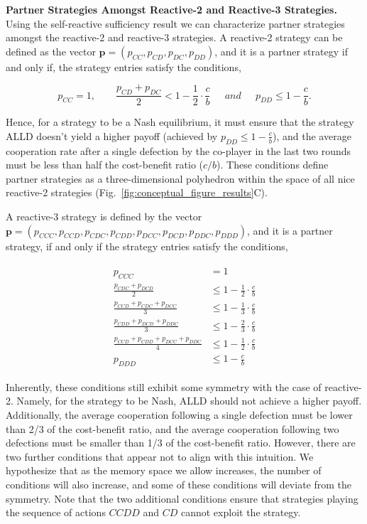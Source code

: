 \documentclass[11pt]{article}
\begin{document}
\textbf{Partner Strategies Amongst Reactive-2 and Reactive-3 Strategies.}
Using the self-reactive sufficiency result we can characterize partner
strategies amongst the reactive-2 and reactive-3 strategies. A reactive-2
strategy can be defined as the vector $\mathbf{p} = (p_{CC}, p_{CD}, p_{DC},
p_{DD})$, and it is a partner strategy if and only if, the strategy entries
satisfy the conditions,

\begin{equation}\label{eq:two_bit_conditions}
  p_{CC} = 1, \qquad \displaystyle \frac{p_{CD} + p_{DC}}{2} < 1 - \frac{1}{2} \cdot \frac{c}{b} \quad ~~and~~ \quad \displaystyle p_{DD} \leq 1\!-\! \frac{c}{b}.
\end{equation}

Hence, for a strategy to be a Nash equilibrium, it must ensure that the strategy
ALLD doesn't yield a higher payoff (achieved by $p_{DD} \leq 1 - \frac{c}{b}$),
and the average cooperation rate after a single defection by the co-player in
the last two rounds must be less than half the cost-benefit ratio ($c/b$). These
conditions define partner strategies as a three-dimensional polyhedron within
the space of all nice reactive-2 strategies
(Fig.~\ref{fig:conceptual_figure_results}C).

A reactive-3 strategy is defined by the vector $\mathbf{p} = (p_{CCC}, p_{CCD},
p_{CDC}, p_{CDD}, p_{DCC}, p_{DCD}, p_{DDC}, p_{DDD})$, and it is a partner strategy,
if and only if the strategy entries satisfy the conditions,

\begin{align}\label{eq:three_bit_conditions}
  \begin{split}
  p_{CCC} & = 1 \\
  \frac{p_{CDC} + p_{DCD}}{2} & \leq 1 - \frac{1}{2} \cdot \frac{c}{b} \\
  \frac{p_{CCD} + p_{CDC} + p_{DCC}}{3} & \leq 1 - \frac{1}{3} \cdot \frac{c}{b} \\
  \frac{p_{CDD} + p_{DCD} + p_{DDC}}{3} & \leq 1 - \frac{2}{3} \cdot \frac{c}{b} \\
  \frac{p_{CCD} + p_{CDD} + p_{DCC} + p_{DDC}}{4}  & \leq 1 - \frac{1}{2} \cdot \frac{c}{b}  \\
  p_{DDD} & \leq 1\!-\! \frac{c}{b}
  \end{split}
\end{align}

Inherently, these conditions still exhibit some symmetry with the case of
reactive-2. Namely, for the strategy to be Nash, ALLD should not achieve a
higher payoff. Additionally, the average cooperation following a single
defection must be lower than 2/3 of the cost-benefit ratio, and the average
cooperation following two defections must be smaller than 1/3 of the
cost-benefit ratio. However, there are two further conditions that appear not to
align with this intuition. We hypothesize that as the memory space we allow
increases, the number of conditions will also increase, and some of these
conditions will deviate from the symmetry. Note that the two additional conditions ensure
that strategies playing the sequence of actions $CCDD$ and $CD$ cannot exploit the
strategy.
\end{document}
